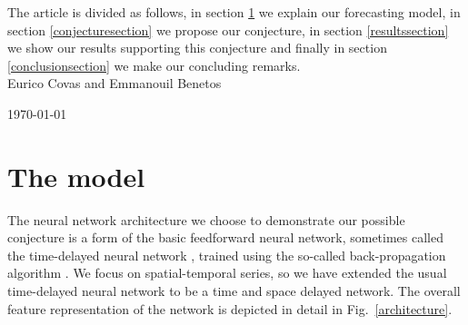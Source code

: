 \documentclass[journal]{IEEEtran}
\begin{document}
The article is divided as follows, in section \ref{modelsection} we explain our forecasting model, in section \ref{conjecturesection} 
we propose our conjecture, in section \ref{resultssection} we show our results supporting this conjecture and finally in section
\ref{conclusionsection} we make our concluding remarks.
\\

\hfill Eurico Covas and Emmanouil Benetos

\hfill \today

\section{The model}
\label{modelsection}

The neural network architecture we choose to demonstrate our possible conjecture is a form of the basic feedforward neural network,
sometimes called the time-delayed neural network \cite{Waibel:1990:PRU:108235.108263}, trained using the so-called back-propagation
algorithm \cite{10.1007/BFb0006203, 1986Natur.323..533R, 58337, Lecun98gradient-basedlearning}. 
We focus on spatial-temporal series, so we have extended the usual time-delayed neural network
to be a time and space delayed network. The overall feature representation of the network is depicted in detail in Fig.\ 
\ref{architecture}.
\end{document}
